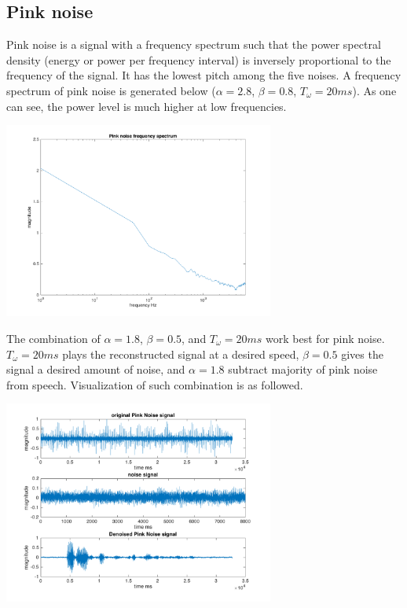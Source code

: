 \documentclass[journal]{IEEEtran}
\begin{document}
\subsection{Pink noise}
\begin{flushleft}
Pink noise is a signal with a frequency spectrum such that the power spectral density (energy or power per frequency interval) is inversely proportional to the frequency of the signal. It has the lowest pitch among the five noises. A frequency spectrum of pink noise is generated below ($\alpha = 2.8$, $\beta = 0.8$, $T_\omega = 20ms$). As one can see, the power level is much higher at low frequencies.
\end{flushleft}
\centering 
\includegraphics[width=3.5in]{pinknoise_log}
\begin{flushleft}
The combination of $\alpha = 1.8$, $\beta = 0.5$, and $T_\omega = 20ms$ work best for pink noise. $T_\omega = 20ms$ plays the reconstructed signal at a desired speed, $\beta = 0.5$ gives the signal a desired amount of noise, and $\alpha = 1.8$ subtract majority of pink noise from speech. Visualization of such combination is as followed. 
\end{flushleft}
\centering 
\includegraphics[width=3.5in]{pinkNoise}
\end{document}
